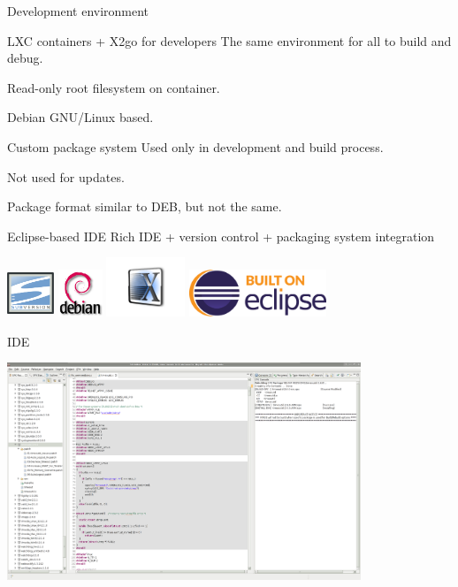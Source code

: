 \documentclass{beamer}
\begin{document}
  \begin{frame}{Development environment}
	  \begin{block}{LXC containers + X2go for developers}
		  The same environment for all to build and debug.

		  Read-only root filesystem on container.

		  Debian GNU/Linux based.
	  \end{block}
	  
	  \begin{block}{Custom package system}
		  Used only in development and build process.

		  Not used for updates.

		  Package format similar to DEB, but not the same.
	  \end{block}

	  \begin{block}{Eclipse-based IDE}
		  Rich IDE + version control + packaging system integration
	  \end{block}
	  
	  \includegraphics[height=40pt,width=40pt]{logo/subversion.png}
	  \includegraphics[height=40pt]{logo/debian.png}
	  \includegraphics[height=50pt]{logo/x2go-logo.png}
	  \includegraphics[height=40pt]{logo/eclipse-mp-built.png}

  \end{frame}

  \begin{frame}{IDE}
	  \begin{center}
		  \includegraphics[width=300pt]{screenshot/ide-screenshot.png}
	  \end{center}
  \end{frame}
  
\end{document}
